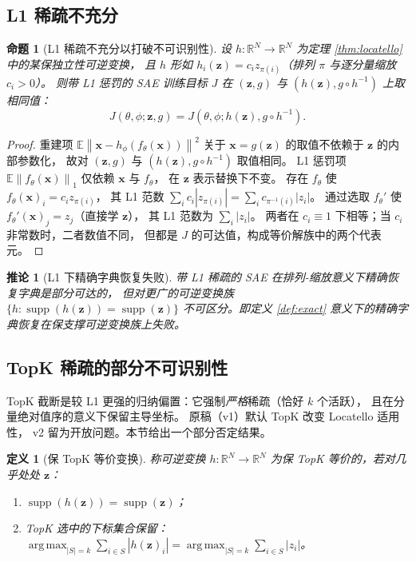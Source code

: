 \documentclass[11pt,a4paper]{article}
\newtheorem{proposition}[theorem]{命题}
\newtheorem{corollary}[theorem]{推论}
\newtheorem{definition}[theorem]{定义}
\theoremstyle{remark}
\DeclareMathOperator{\supp}{supp}
\DeclareMathOperator*{\argmax}{arg\,max}
\newcommand{\R}{\mathbb{R}}
\newcommand{\Z}{\bm{z}}
\newcommand{\X}{\bm{x}}
\newcommand{\norm}[1]{\left\lVert#1\right\rVert}
\begin{document}
\subsection{L1 稀疏不充分}

\begin{proposition}[L1 稀疏不充分以打破不可识别性]\label{prop:l1-insuff}
设 $h: \R^N \to \R^N$ 为定理 \ref{thm:locatello} 中的某保独立性可逆变换，
且 $h$ 形如 $h_i(\Z) = c_i z_{\pi(i)}$（排列 $\pi$ 与逐分量缩放 $c_i > 0$）。
则带 L1 惩罚的 SAE 训练目标 $J$ 在 $(\Z, g)$ 与 $(h(\Z), g \circ h^{-1})$ 上取相同值：
\[
J(\theta,\phi; \Z, g) = J(\theta,\phi; h(\Z), g \circ h^{-1}).
\]
\end{proposition}

\begin{proof}
重建项 $\mathbb{E}\norm{\X - h_\phi(f_\theta(\X))}^2$
关于 $\X = g(\Z)$ 的取值不依赖于 $\Z$ 的内部参数化，
故对 $(\Z, g)$ 与 $(h(\Z), g \circ h^{-1})$ 取值相同。
L1 惩罚项 $\mathbb{E}\norm{f_\theta(\X)}_1$ 仅依赖 $\X$ 与 $f_\theta$，
在 $\Z$ 表示替换下不变。
存在 $f_\theta$ 使 $f_\theta(\X)_i = c_i z_{\pi(i)}$，
其 L1 范数 $\sum_i c_i |z_{\pi(i)}| = \sum_i c_{\pi^{-1}(i)} |z_i|$。
通过选取 $f_\theta'$ 使 $f_\theta'(\X)_j = z_j$（直接学 $\Z$），
其 L1 范数为 $\sum_i |z_i|$。
两者在 $c_i \equiv 1$ 下相等；当 $c_i$ 非常数时，二者数值不同，
但都是 $J$ 的可达值，构成等价解族中的两个代表元。
\end{proof}

\begin{corollary}[L1 下精确字典恢复失败]\label{cor:l1-fail}
带 L1 稀疏的 SAE 在排列-缩放意义下精确恢复字典是\emph{部分可达}的，
但对更广的可逆变换族 $\{h: \supp(h(\Z)) = \supp(\Z)\}$
不可区分。即定义 \ref{def:exact} 意义下的精确字典恢复在保支撑可逆变换族上失败。
\end{corollary}

\subsection{TopK 稀疏的部分不可识别性}\label{sec:topk}

TopK 截断是较 L1 更强的归纳偏置：它强制\emph{严格}稀疏（恰好 $k$ 个活跃），
且在分量绝对值序的意义下保留主导坐标。
原稿（v1）默认 TopK 改变 Locatello 适用性，
v2 留为开放问题。本节给出一个部分否定结果。

\begin{definition}[保 TopK 等价变换]\label{def:topk-equiv}
称可逆变换 $h: \R^N \to \R^N$ 为\emph{保 TopK 等价}的，若对几乎处处 $\Z$：
\begin{enumerate}[leftmargin=*,itemsep=2pt]
\item $\supp(h(\Z)) = \supp(\Z)$；
\item TopK 选中的下标集合保留：
$\argmax_{|S| = k} \sum_{i \in S} |h(\Z)_i| = \argmax_{|S| = k} \sum_{i \in S} |z_i|$。
\end{enumerate}
\end{definition}
\end{document}
